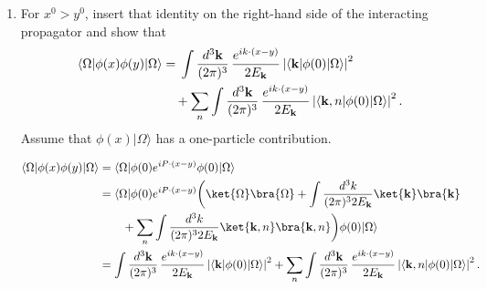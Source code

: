 \begin{enumerate}[label=\alph*)]
    \item For $x^0>y^0$, insert that identity on the right-hand side of the
    interacting propagator and show that
    \begin{align}
        \langle\Omega|\phi(x)\phi(y)|\Omega\rangle
        &={}
        \int\frac{d^3\mathbf k}{(2\pi)^3}\,
        \frac{e^{ik\cdot(x-y)}}{2E_{\mathbf k}}
        \left|\langle\mathbf k|\phi(0)|\Omega\rangle\right|^2
        \notag\\
        &\quad+
        \sum_n\int\frac{d^3\mathbf k}{(2\pi)^3}\,
        \frac{e^{ik\cdot(x-y)}}{2E_{\mathbf k}}
        \left|\langle\mathbf k,n|\phi(0)|\Omega\rangle\right|^2.
    \end{align}
    Assume that $\phi(x)|\Omega\rangle$ has a one-particle contribution.
    \begin{solution}
        \begin{equation}
            \begin{aligned}
                 \langle\Omega|\phi(x)\phi(y)|\Omega\rangle &=  \langle\Omega|\phi(0)e^{iP\cdot (x-y)}\phi(0)|\Omega\rangle\\
                 &=\langle\Omega|\phi(0)e^{iP\cdot (x-y)}\bigg(\ket{\Omega}\bra{\Omega} + \int\frac{d^3k}{(2\pi)^32E_\mathbf{k}}\ket{\mathbf{k}}\bra{\mathbf{k}} \\
                 &\qquad+ \sum_n\int\frac{d^3k}{(2\pi)^32E_\mathbf{k}}\ket{\mathbf{k},n}\bra{\mathbf{k},n}\bigg)\phi(0)|\Omega\rangle\\
                 &=\int\frac{d^3\mathbf k}{(2\pi)^3}\,
        \frac{e^{ik\cdot(x-y)}}{2E_{\mathbf k}}
        \left|\langle\mathbf k|\phi(0)|\Omega\rangle\right|^2
        +
        \sum_n\int\frac{d^3\mathbf k}{(2\pi)^3}\,
        \frac{e^{ik\cdot(x-y)}}{2E_{\mathbf k}}
        \left|\langle\mathbf k,n|\phi(0)|\Omega\rangle\right|^2.
            \end{aligned}
        \end{equation}
    \end{solution}


\end{enumerate}

